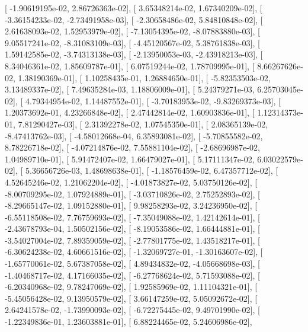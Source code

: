 \documentclass{article}
\begin{document}
       [ -1.90619195e-02,   2.86726363e-02],
       [  3.65348214e-02,   1.67340209e-02],
       [ -3.36154233e-02,  -2.73491958e-03],
       [ -2.30658486e-02,   5.84810848e-02],
       [  2.61638093e-02,   1.52953979e-02],
       [ -7.13054395e-02,  -8.07883880e-03],
       [  9.05517241e-02,  -8.31083109e-03],
       [ -4.45120567e-02,   5.38761838e-03],
       [  1.59142585e-02,  -3.74313138e-03],
       [ -2.13950053e-03,  -2.43918213e-03],
       [  8.34046361e-02,   1.85609787e-01],
       [  6.07519244e-02,   1.78709995e-01],
       [  8.66267626e-02,   1.38190369e-01],
       [  1.10258435e-01,   1.26884650e-01],
       [ -5.82353503e-02,   3.13489337e-02],
       [  7.49635284e-03,   1.18806009e-01],
       [  5.24379271e-03,   6.25703045e-02],
       [  4.79344954e-02,   1.14487552e-01],
       [ -3.70183953e-02,  -9.83269373e-03],
       [  1.20373692e-01,   4.23266848e-02],
       [  2.47442814e-02,   1.60903836e-01],
       [  1.12314373e-01,   7.81290427e-03],
       [  2.31392278e-02,   1.07545350e-01],
       [  2.08365139e-02,  -8.47413762e-03],
       [ -4.58012668e-04,   6.35893081e-02],
       [ -5.70855582e-02,   8.78226718e-02],
       [ -4.07214876e-02,   7.55881104e-02],
       [ -2.68696987e-02,   1.04989710e-01],
       [  5.91472407e-02,   1.66479027e-01],
       [  5.17111347e-02,   6.03022579e-02],
       [  5.36656726e-03,   1.48698638e-01],
       [ -1.18576459e-02,   6.47357712e-02],
       [  4.52645246e-02,   1.21062204e-02],
       [ -4.01873827e-02,   5.03750126e-02],
       [ -8.00709295e-02,   1.07924889e-01],
       [ -3.03710826e-02,   2.75252893e-02],
       [ -8.29665147e-02,   1.09152880e-01],
       [  9.98258293e-02,   3.24236950e-02],
       [ -6.55118508e-02,   7.76759693e-02],
       [ -7.35049088e-02,   1.42142614e-01],
       [ -2.43678793e-04,   1.50502156e-02],
       [ -8.19053586e-02,   1.66444881e-01],
       [ -3.54027004e-02,   7.89359059e-02],
       [ -2.77801775e-02,   1.43518217e-01],
       [ -6.30624238e-02,   4.60661516e-02],
       [ -1.32069727e-01,  -1.30163607e-02],
       [ -1.65770061e-02,   5.67387058e-02],
       [  4.89434832e-02,  -4.05668698e-03],
       [ -1.40468717e-02,   4.17166035e-02],
       [ -6.27768624e-02,   5.71593088e-02],
       [ -6.20340968e-02,   9.78247069e-02],
       [  1.92585969e-02,   1.11104321e-01],
       [ -5.45056428e-02,   9.13950579e-02],
       [  3.66147259e-02,   5.05092672e-02],
       [  2.64241578e-02,  -1.73990093e-02],
       [ -6.72275445e-02,   9.49701990e-02],
       [ -1.22349836e-01,   1.23603881e-01],
       [  6.88224465e-02,   5.24606986e-02],
\end{document}
